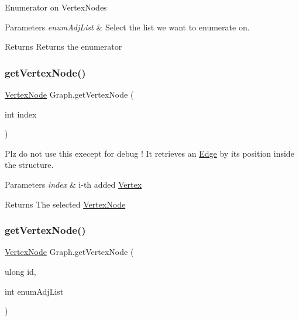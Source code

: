Enumerator on Vertex\+Nodes 


\begin{DoxyParams}{Parameters}
{\em enum\+Adj\+List} & Select the list we want to enumerate on.\\
\hline
\end{DoxyParams}
\begin{DoxyReturn}{Returns}
Returns the enumerator
\end{DoxyReturn}
\mbox{\label{classGraph_a79ba5668642e260f6baced8749cf946d}} 
\subsubsection{\texorpdfstring{get\+Vertex\+Node()}{getVertexNode()}\hspace{0.1cm}{\footnotesize\ttfamily [1/2]}}
{\footnotesize\ttfamily \hyperlink{classVertexNode}{Vertex\+Node} Graph.\+get\+Vertex\+Node (\begin{DoxyParamCaption}\item[{int}]{index }\end{DoxyParamCaption})\hspace{0.3cm}{\ttfamily [inline]}}



Plz do not use this execept for debug ! It retrieves an \hyperlink{classEdge}{Edge} by its position inside the structure. 


\begin{DoxyParams}{Parameters}
{\em index} & i-\/th added \hyperlink{structVertex}{Vertex}\\
\hline
\end{DoxyParams}
\begin{DoxyReturn}{Returns}
The selected \hyperlink{classVertexNode}{Vertex\+Node}
\end{DoxyReturn}
\mbox{\label{classGraph_ac4a38465640c1aa5cd4f6e1e3b84c0a2}} 
\subsubsection{\texorpdfstring{get\+Vertex\+Node()}{getVertexNode()}\hspace{0.1cm}{\footnotesize\ttfamily [2/2]}}
{\footnotesize\ttfamily \hyperlink{classVertexNode}{Vertex\+Node} Graph.\+get\+Vertex\+Node (\begin{DoxyParamCaption}\item[{ulong}]{id,  }\item[{int}]{enum\+Adj\+List }\end{DoxyParamCaption})\hspace{0.3cm}{\ttfamily [inline]}}



